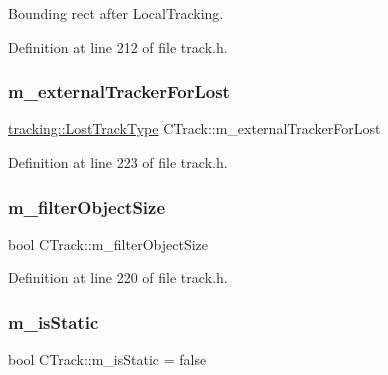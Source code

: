 Bounding rect after Local\+Tracking. 



Definition at line 212 of file track.\+h.

\mbox{\label{class_c_track_a7d1f6c9d8d56790a28a7139e85896dc8}} 
\subsubsection{\texorpdfstring{m\+\_\+external\+Tracker\+For\+Lost}{m\_externalTrackerForLost}}
{\footnotesize\ttfamily \mbox{\hyperlink{namespacetracking_a5377d69122ad915004ef68a518d22be3}{tracking\+::\+Lost\+Track\+Type}} C\+Track\+::m\+\_\+external\+Tracker\+For\+Lost\hspace{0.3cm}{\ttfamily [private]}}



Definition at line 223 of file track.\+h.

\mbox{\label{class_c_track_a5573dab5b9fe2e5143204355b8146c87}} 
\subsubsection{\texorpdfstring{m\+\_\+filter\+Object\+Size}{m\_filterObjectSize}}
{\footnotesize\ttfamily bool C\+Track\+::m\+\_\+filter\+Object\+Size\hspace{0.3cm}{\ttfamily [private]}}



Definition at line 220 of file track.\+h.

\mbox{\label{class_c_track_a37f858466a4c5de19eea18ab829e4745}} 
\subsubsection{\texorpdfstring{m\+\_\+is\+Static}{m\_isStatic}}
{\footnotesize\ttfamily bool C\+Track\+::m\+\_\+is\+Static = false\hspace{0.3cm}{\ttfamily [private]}}



